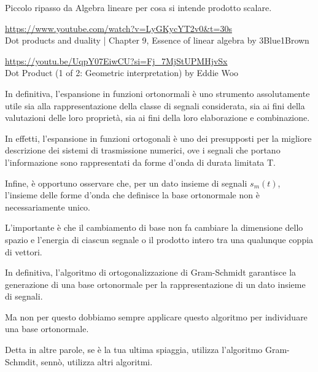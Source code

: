 \begin{tcolorbox}
    Piccolo ripasso da Algebra lineare per cosa si intende prodotto scalare. \newline 

    \url{https://www.youtube.com/watch?v=LyGKycYT2v0&t=30s} \\
    Dot products and duality | Chapter 9, Essence of linear algebra by 3Blue1Brown \newline 

    \url{https://youtu.be/UqpY07EiwCU?si=Fj_7MjStUPMHjvSx}\\ 
    Dot Product (1 of 2: Geometric interpretation) by Eddie Woo
\end{tcolorbox}

In definitiva, l'espansione in funzioni ortonormali è uno strumento assolutamente utile sia alla rappresentazione della classe di segnali considerata, 
sia ai fini della valutazioni delle loro proprietà, 
sia ai fini della loro elaborazione e combinazione. \newline 

In effetti, l'espansione in funzioni ortogonali è uno dei presupposti per la migliore descrizione dei sistemi di trasmissione numerici, 
ove i segnali che portano l'informazione sono rappresentati da forme d'onda di durata limitata T. \newline 

Infine, è opportuno osservare che, per un dato insieme di segnali $s_{m} (t)$, 
l'insieme delle forme d'onda che definisce la base ortonormale non è necessariamente unico. \newline 

L'importante è che il cambiamento di base non fa cambiare la dimensione dello spazio e l'energia di ciascun segnale o il prodotto intero tra una qualunque coppia di vettori. \newline 

In definitiva, l'algoritmo di ortogonalizzazione di Gram-Schmidt garantisce la generazione di una base ortonormale per la rappresentazione di un dato insieme di segnali. \newline

Ma non per questo dobbiamo sempre applicare questo algoritmo per individuare una base ortonormale. \newline 

\begin{tcolorbox}
    Detta in altre parole, se è la tua ultima spiaggia, utilizza l'algoritmo Gram-Schmdit, sennò, utilizza altri algoritmi.
\end{tcolorbox}

